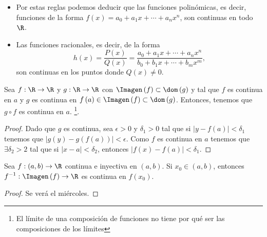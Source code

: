 \begin{eg}
\normalfont 
\begin{itemize}
\item Por estas reglas podemos deducir que las funciones polinómicas, es decir, funciones de la forma $\displaystyle f\left(x\right) = a_{0} + a_{1}x + \cdots + a_{n}x^{n} $, son continuas en todo $\displaystyle \R $.
\item Las funciones racionales, es decir, de la forma
	\[h\left(x\right) = \frac{P\left(x\right)}{Q\left(x\right)} = \frac{a_{0} + a_{1}x + \cdots + a_{n}x^{n}}{b_{0} + b_{1}x + \cdots + b_{m}x^{m}} ,\]
	son continuas en los puntos donde $\displaystyle Q\left(x\right) \neq 0 $.
\end{itemize}
\end{eg}
\begin{ftheorem}[]
\normalfont Sea $\displaystyle f : \R \to \R $ y $\displaystyle g : \R \to \R $ con $\displaystyle \Imagen\left(f\right) \subset \dom\left(g\right) $ y tal que $\displaystyle f $ es continua en $\displaystyle a $ y $\displaystyle g $ es continua en $\displaystyle f\left(a\right) \in \Imagen\left(f\right) \subset \dom\left(g\right) $. Entonces, tenemos que $\displaystyle g \circ f $ es continua en $\displaystyle a $. \footnote{El límite de una composición de funciones no tiene por qué ser las composiciones de los límites}.
\end{ftheorem}
\begin{proof}
Dado que $\displaystyle g $ es continua, sea $\displaystyle \epsilon > 0 $ y $\displaystyle \delta_{1} > 0 $ tal que si $\displaystyle \left|y - f\left(a\right)\right| < \delta _{1} $ tenemos que $\displaystyle \left|g\left(y\right) - g\left(f\left(a\right)\right)\right| < \epsilon  $. Como $\displaystyle f $ es continua en $\displaystyle a $ tenemos que $\displaystyle \exists \delta _{2} > 2 $ tal que si $\displaystyle \left|x - a\right|< \delta_{2} $, entonces $\displaystyle \left|f\left(x\right)-f\left(a\right)\right| < \delta_{1} $. 
\end{proof}
\begin{ftheorem}[]
\normalfont Sea $\displaystyle f: \left(a,b\right) \to \R $ continua e inyectiva en $\displaystyle \left(a,b\right) $. Si $\displaystyle x_{0} \in \left(a,b\right) $, entonces $\displaystyle f^{-1} : \Imagen\left(f\right) \to \R $ es continua en $\displaystyle f\left(x_{0}\right) $.
\end{ftheorem}
\begin{proof}
Se verá el miércoles.
\end{proof}
